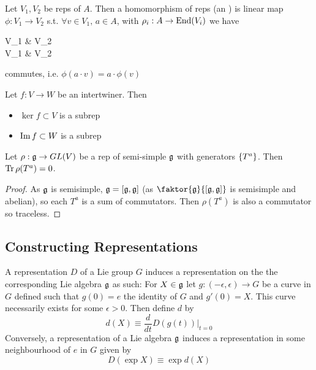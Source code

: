 \documentclass{article}
\begin{document}
\begin{definition}
	Let $V_1,V_2$ be reps of $A$. Then a homomorphism of reps (an ) is linear map $\phi: V_1 \to V_2$ s.t. $\forall v \in V_1, \, a \in A$, with $\rho_i : A \to \End(V_i)$ we have 
	\begin{tkz}
		V_1 \arrow[r,"\phi"] \arrow[d,"\rho_1(a)"'] & V_2 \arrow[d,"\rho_2(a)"] \\ V_1 \arrow[r,"\phi"'] & V_2 
	\end{tkz}
	commutes, i.e. $\phi(a \cdot v) = a \cdot \phi(v)$
\end{definition}

\begin{prop}
	Let $f: V \to W$ be an intertwiner. Then 
	\begin{itemize}
		\item $\ker f \subset V$ is a subrep
		\item $\image f \subset W$ is a subrep
	\end{itemize}
\end{prop}

\begin{prop}
	Let $\rho:\mf{g}\to GL(V)$ be a rep of semi-simple $\mf{g}$ with generators $\pbrace{T^a}$. Then $\tr\rho(T^a)=0$.
\end{prop}
\begin{proof}
	As $\mf{g}$ is semisimple, $\mf{g} = \comm[\mf{g}]{\mf{g}}$ (as $\faktor{\mf{g}}{\comm[\mf{g}]{\mf{g}}}$ is semisimple and abelian), so each $T^a$ is a sum of commutators. Then $\rho(T^a)$ is also a commutator so traceless. 
\end{proof}


\subsection{Constructing Representations}

\begin{theorem}
	A representation $D$ of a Lie group $G$ induces a representation on the the corresponding Lie algebra $\mf{g}$ as such: For $X\in\mf{g}$ let $g:(-\epsilon, \epsilon)\to G$ be a curve in $G$ defined such that $g(0)=e$ the identity of $G$ and $g'(0)=X$. This curve necessarily exists for some $\epsilon>0$. Then define $d$ by \[
	d(X)\equiv\frac{d}{dt} D\left(g(t)\right) \vert_{t=0}
	\]
	Conversely, a representation of a Lie algebra $\mf{g}$ induces a representation in some neighbourhood of $e$ in $G$ given by 
	\[
	D(\exp{X})\equiv\exp{d(X)}
	\]
\end{theorem}
\end{document}

